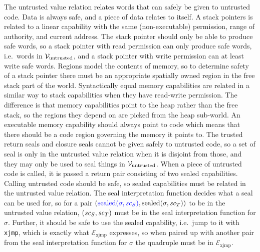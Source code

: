 \documentclass[acmsmall,review,anonymous]{acmart}\settopmatter{printfolios=true,printccs=false,printacmref=false}
\begin{document}
The untrusted value relation relates words that can safely be given to untrusted code.
Data is always safe, and a piece of data relates to itself.
A stack pointers is related to a linear capability with the same (non-executable) permission, range of authority, and current address.
The stack pointer should only be able to produce safe words, so a stack pointer with read permission can only produce safe words, i.e.\ words in $\mathcal{V}_{\mathrm{untrusted}}$, and a stack pointer with write permission can at least write safe words.
Regions model the contents of memory, so to determine safety of a stack pointer there must be an appropriate spatially owned region in the free stack part of the world.
Syntactically equal memory capabilities are related in a similar way to stack capabilities when they have read-write permission.
The difference is that memory capabilities point to the heap rather than the free stack, so the regions they depend on are picked from the heap sub-world.
An executable memory capability should always point to code which means that there should be a code region governing the memory it points to.
The trusted return seals and closure seals cannot be given safely to untrusted code, so a set of seal is only in the untrusted value relation when it is disjoint from those, and they may only be used to seal things in $\mathcal{V}_{\mathrm{untrusted}}$.
When a piece of untrusted code is called, it is passed a return pair consisting of two sealed capabilities.
Calling untrusted code should be safe, so sealed capabilities must be related in the untrusted value relation.
The seal interpretation function decides what a seal can be used for, so for a pair $({\color{blue} \mathrm{sealed}(\sigma,\mathit{sc}_S)}, \mathrm{sealed}(\sigma,\mathit{sc}_T))$ to be in the untrusted value relation, $(\mathit{sc}_S,\mathit{sc}_T)$ must be in the seal interpretation function for $\sigma$.
Further, it should be safe to use the sealed capability, i.e.\ jump to it with \texttt{xjmp}, which is exactly what $\mathcal{E}_{\mathrm{xjmp}}$ expresses, so when paired up with another pair from the seal interpretation function for $\sigma$ the quadruple must be in $\mathcal{E}_{\mathrm{xjmp}}$.
\end{document}
